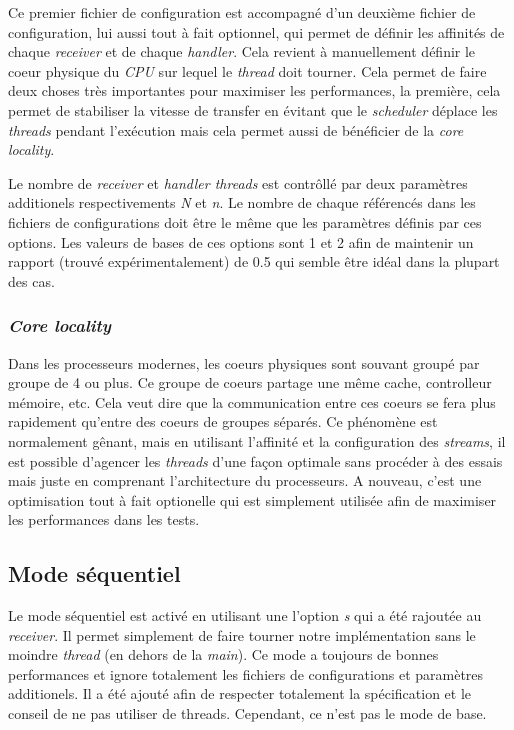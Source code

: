 \documentclass[../main.tex]{subfiles}
\begin{document}
Ce premier fichier de configuration est accompagné d'un deuxième fichier de configuration, lui aussi tout à fait optionnel, qui permet de définir les affinités
de chaque \textit{receiver} et de chaque \textit{handler}. Cela revient à manuellement définir le coeur physique du \textit{CPU} sur lequel le \textit{thread}
doit tourner. Cela permet de faire deux choses très importantes pour maximiser les performances, la première, cela permet de stabiliser la vitesse de transfer
en évitant que le \textit{scheduler} déplace les \textit{threads} pendant l'exécution mais cela permet aussi de bénéficier de la \textit{core locality}.

Le nombre de \textit{receiver} et \textit{handler threads} est contrôllé par deux paramètres additionels respectivements \textit{N} et \textit{n}. Le nombre
de chaque référencés dans les fichiers de configurations doit être le même que les paramètres définis par ces options. Les valeurs de bases de ces options sont
1 et 2 afin de maintenir un rapport (trouvé expérimentalement) de 0.5 qui semble être idéal dans la plupart des cas.

\subsubsection{\textit{Core locality}}

Dans les processeurs modernes, les coeurs physiques sont souvant groupé par groupe de 4 ou plus. Ce groupe de coeurs partage une même cache, controlleur mémoire, etc.
Cela veut dire que la communication entre ces coeurs se fera plus rapidement qu'entre des coeurs de groupes séparés. Ce phénomène est normalement gênant, mais
en utilisant l'affinité et la configuration des \textit{streams}, il est possible d'agencer les \textit{threads} d'une façon optimale sans procéder à des essais
mais juste en comprenant l'architecture du processeurs. A nouveau, c'est une optimisation tout à fait optionelle qui est simplement utilisée afin de maximiser
les performances dans les tests.

\subsection{Mode séquentiel}
\label{sec:sequential}

Le mode séquentiel est activé en utilisant une l'option \textit{s} qui a été rajoutée au \textit{receiver}. Il permet simplement de faire 
tourner notre implémentation sans le moindre \textit{thread} (en dehors de la \textit{main}). Ce mode a toujours de bonnes performances et ignore totalement 
les fichiers de configurations et paramètres additionels. Il a été ajouté afin de respecter totalement la spécification et le conseil de ne pas utiliser de 
threads. Cependant, ce n'est pas le mode de base.
\end{document}
